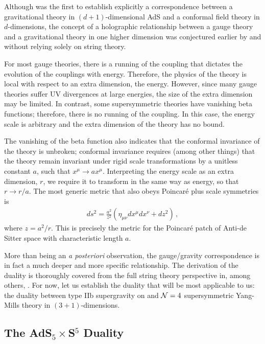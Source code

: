 \documentclass[../PhD.tex]{subfiles}
\begin{document}
Although \cite{hep-th/9711200} was the first to establish explicitly a correspondence between a gravitational theory in $(d+1)$-dimensional AdS and a conformal field theory in $d$-dimensions, the concept of a holographic relationship between a gauge theory and a gravitational theory in one higher dimension was conjectured earlier by \cite{gr-qc/9310026} and \cite{hep-th/9409089} without relying solely on string theory. 

For most gauge theories, there is a running of the coupling that dictates the evolution of the couplings with energy. Therefore, the physics of the theory is local with respect to an extra dimension, the energy. However, since many gauge theories suffer UV divergences at large energies, the size of the extra dimension may be limited. In contrast, some supersymmetric theories have vanishing beta functions; therefore, there is no running of the coupling. In this case, the energy scale is arbitrary and the extra dimension of the theory has no bound.

The vanishing of the beta function also indicates that the conformal invariance of the theory is unbroken; conformal invariance requires (among other things) that the theory remain invariant under rigid scale transformations by a unitless constant $a$, such that $x^\mu \to a x^\mu$. Interpreting the energy scale as an extra dimension, $r$, we require it to transform in the same way as energy, so that $r \to r/ a$. The most generic metric that also obeys Poincar\'e plus scale symmetries is
\begin{align}
\label{Poincare ads}
ds^2 = \frac{a^2}{z^2} \left( \eta_{\mu \nu}dx^\mu dx^\nu +dz^2 \right) \, ,
\end{align}
where $z = a^2 / r$. This is precisely the metric for the Poincar\'e patch of Anti-de Sitter space with characteristic length $a$. 

More than being an \emph{a posteriori} observation, the gauge/gravity correspondence is in fact a much deeper and more specific relationship. The derivation of the duality is thoroughly covered from the full string theory perspective in, among others, \cite{hep-th/9711200, gr-qc/0602037, hep-th/9902131, hep-th/9905111}. For now, let us establish the duality that will be most applicable to us: the duality between type IIb supergravity on \ads and $\mathcal N = 4$ supersymmetric Yang-Mills theory in $(3+1)$-dimensions.


\subsection{The AdS$_5 \times$S$^5$ Duality}
\label{ssec: AdS5xS5}
\end{document}
